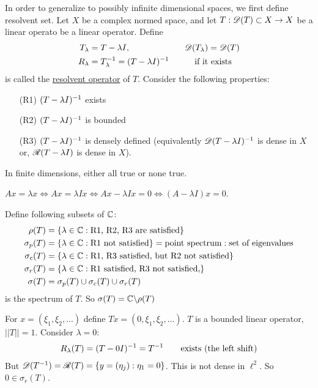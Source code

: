 \documentclass[]{article}
\begin{document}
In order to generalize to possibly infinite dimensional spaces, we first define resolvent set.
Let $X$ be a complex normed space, and let $T:\mathscr{D}(T)\subset X\rightarrow X$ be a linear operato be a linear operator. Define
\begin{align*}
	T_\lambda &= T-\lambda I, & \mathscr{D}(T_\lambda) &= \mathscr{D}(T) \\
	R_\lambda &= T_\lambda^{-1} = (T-\lambda I)^{-1} & \qquad \text{if it} & \text{ exists}
\end{align*}
is called the \ul{resolvent operator} of $T$.
Consider the following properties:
\begin{enumerate}
	\item[(R1)] $(T-\lambda I)^{-1}$ exists
	\item[(R2)] $(T-\lambda I)^{-1}$ is bounded
	\item[(R3)] $(T-\lambda I)^{-1}$ is densely defined
		(equivalently $\mathscr{D}(T-\lambda I)^{-1}$ is dense in $X$ or, $\mathscr{R}(T-\lambda I)$ is dense in $X$).
\end{enumerate}
In finite dimensions, either all true or none true.
\begin{remark}
	$Ax=\lambda x\iff Ax=\lambda Ix\iff Ax-\lambda Ix = 0 \iff (A-\lambda I)x = 0$.
\end{remark}
\newpage
Define following subsets of $\mathbb{C}$: 
\begin{align*}
	\rho(T) &= \left\{ \lambda\in\mathbb{C} : \text{R1, R2, R3 are satisfied} \right\} \\
	\sigma_p(T) &= \left\{ \lambda\in\mathbb{C} : \text{R1 not satisfied} \right\} = \text{point spectrum}:\text{set of eigenvalues} \\
	\sigma_c(T) &= \left\{ \lambda\in\mathbb{C} : \text{R1, R3 satisfied, but R2 not satisfied} \right\}\\
	\sigma_r(T) &= \left\{ \lambda\in\mathbb{C} : \text{R1 satisfied, R3 not satisfied,} \right\} \\
	\sigma(T) &= \sigma_p(T)\cup\sigma_c(T)\cup\sigma_r(T)
\end{align*}
is the spectrum of $T$.
So $\sigma(T) = \mathbb{C}\backslash\rho(T)$
\begin{example}
	[$X=\ell^2$] For $x=(\xi_1,\xi_2,\dots)$ define $Tx=(0,\xi_1,\xi_2,\dots)$.
	$T$ is a bounded linear operator, $||T||=1$. Consider $\lambda = 0$:
	\begin{align*}
		R_\lambda(T) = (T-0I)^{-1} = T^{-1} \qquad \text{exists (the left shift)}
	\end{align*}
	But $\mathscr{D}(T^{-1}) = \mathscr{R}(T) = \left\{ y=(\eta_j) : \eta_1=0 \right\}$.
	This is not dense in $\ell^2$. So $0\in\sigma_r(T)$.
\end{example}
\end{document}
